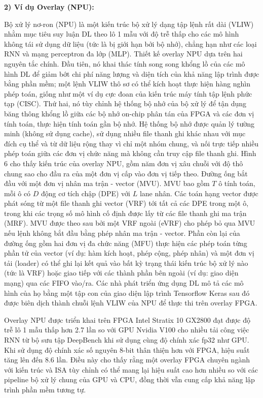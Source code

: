 \documentclass[a4paper]{article}
\begin{document}
\textbf{2) Ví dụ Overlay (NPU):}

Bộ xử lý nơ-ron (NPU) là một kiến trúc bộ xử lý dạng tập lệnh rất dài (VLIW) nhằm mục tiêu suy luận DL theo lô 1 mẫu với độ trễ thấp cho các mô hình không tái sử dụng dữ liệu (tức là bị giới hạn bởi bộ nhớ), chẳng hạn như các loại RNN và mạng perceptron đa lớp (MLP). Thiết kế overlay NPU dựa trên hai nguyên tắc chính. Đầu tiên, nó khai thác tính song song khổng lồ của các mô hình DL để giảm bớt chi phí năng lượng và diện tích của khả năng lập trình được bằng phần mềm; một lệnh VLIW thô sơ có thể kích hoạt thực hiện hàng nghìn phép toán, giống như một ví dụ cực đoan của kiến trúc máy tính tập lệnh phức tạp (CISC). Thứ hai, nó tùy chỉnh hệ thống bộ nhớ của bộ xử lý để tận dụng băng thông khổng lồ giữa các bộ nhớ on-chip phân tán của FPGA và các đơn vị tính toán, thực hiện tính toán gần bộ nhớ. Hệ thống bộ nhớ được quản lý tường minh (không sử dụng cache), sử dụng nhiều file thanh ghi khác nhau với mục đích cụ thể và từ dữ liệu rộng thay vì chỉ một nhóm chung, và nối trực tiếp nhiều phép toán giữa các đơn vị chức năng mà không cần truy cập file thanh ghi. Hình 6 cho thấy kiến trúc của overlay NPU, gồm năm đơn vị xâu chuỗi với độ thô chung sao cho đầu ra của một đơn vị cấp vào đơn vị tiếp theo. Đường ống bắt đầu với một đơn vị nhân ma trận - vector (MVU). MVU bao gồm $T$ ô tính toán, mỗi ô có $D$ động cơ tích chập (DPE) với $L$ lane nhân. Các toán hạng vector được phát sóng từ một file thanh ghi vector (VRF) tới tất cả các DPE trong một ô, trong khi các trọng số mô hình cố định được lấy từ các file thanh ghi ma trận (MRF). MVU được theo sau bởi một VRF ngoài (eVRF) cho phép bỏ qua MVU nếu lệnh không bắt đầu bằng phép nhân ma trận - vector. Phần còn lại của đường ống gồm hai đơn vị đa chức năng (MFU) thực hiện các phép toán từng phần tử của vector (ví dụ: hàm kích hoạt, phép cộng, phép nhân) và một đơn vị tải (loader) có thể ghi lại kết quả vào bất kỳ trạng thái kiến trúc bộ xử lý nào (tức là VRF) hoặc giao tiếp với các thành phần bên ngoài (ví dụ: giao diện mạng) qua các FIFO vào/ra. Các nhà phát triển ứng dụng DL mô tả các mô hình của họ bằng một tập con của giao diện lập trình Tensorflow Keras sau đó được biên dịch thành chuỗi lệnh VLIW của NPU để thực thi trên overlay FPGA.

Overlay NPU được triển khai trên FPGA Intel Stratix 10 GX2800 đạt được độ trễ lô 1 mẫu thấp hơn 2.7 lần so với GPU Nvidia V100 cho nhiều tải công việc RNN từ bộ sưu tập DeepBench khi sử dụng cùng độ chính xác fp32 như GPU. Khi sử dụng độ chính xác số nguyên 8-bit thân thiện hơn với FPGA, hiệu suất tăng lên đến 8.6 lần. Điều này cho thấy rằng một overlay FPGA chuyên ngành với kiến trúc và ISA tùy chỉnh có thể mang lại hiệu suất cao hơn nhiều so với các pipeline bộ xử lý chung của GPU và CPU, đồng thời vẫn cung cấp khả năng lập trình phần mềm tương tự.
\end{document}

